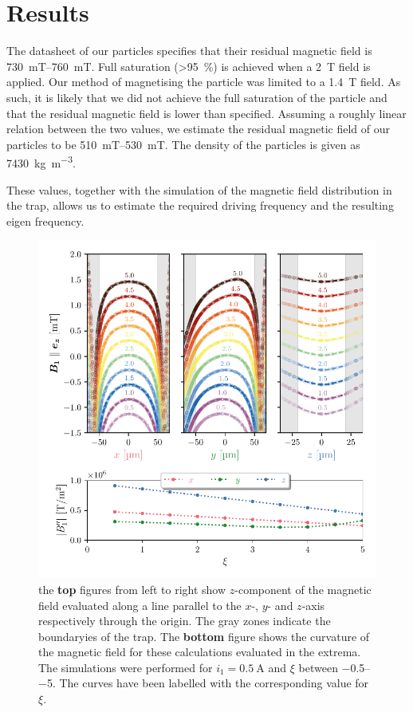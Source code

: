 \chapter{Results}
\label{chap:results}
The datasheet of our  particles specifies that their residual magnetic field is \qtyrange{730}{760}{\milli\tesla}. Full saturation (\qty{>95}{\percent}) is achieved when a \qty{2}{\tesla} field is applied. Our method of magnetising the particle was limited to a \qty{1.4}{\tesla} field. As such, it is likely that we did not achieve the full saturation of the particle and that the residual magnetic field is lower than specified. Assuming a roughly linear relation between the two values, we estimate the residual magnetic field of our particles to be \qtyrange{510}{530}{\milli\tesla}. The density of the particles is given as \qty{7430}{\kilo\gram\per\cubic\meter}.

These values, together with the simulation of the magnetic field distribution in the trap, allows us to estimate the required driving frequency and the resulting eigen frequency.

\begin{figure}
    \centering
    \includegraphics{figures/data/magnetic_field_curvature.pdf}
    \caption{the \textbf{top} figures from left to right show $z$-component of the magnetic field evaluated along a line parallel to the $x$-, $y$- and $z$-axis respectively through the origin. The gray zones indicate the boundaryies of the trap. The \textbf{bottom} figure shows the curvature of the magnetic field for these calculations evaluated in the extrema. The simulations were performed for $i_1=\qty{0.5}{\ampere}$ and $\xi$ between \numrange{-0.5}{-5}. The curves have been labelled with the corresponding value for $\xi$.}
\end{figure}

